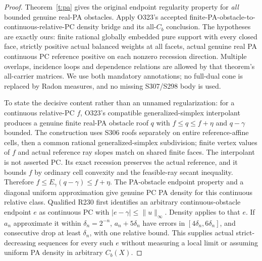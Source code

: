 \documentclass[11pt]{article}
\begin{document}
\begin{proof}
Theorem~\ref{t:pa} gives the original endpoint regularity property for \emph{all} bounded genuine real-PA obstacles. Apply O323's accepted finite-PA-obstacle-to-continuous-relative-PC density bridge and its all-$C_b$ conclusion. The hypotheses are exactly ours: finite rational globally embedded pure support with every closed face, strictly positive actual balanced weights at all facets, actual genuine real PA continuous PC reference positive on each nonzero recession direction. Multiple overlaps, incidence loops and dependence relations are allowed by that theorem's all-carrier matrices. We use both mandatory annotations; no full-dual cone is replaced by Radon measures, and no missing S307/S298 body is used.

To state the decisive content rather than an unnamed regularization: for a continuous relative-PC $f$, O323's compatible generalized-simplex interpolant produces a genuine finite real-PA obstacle roof $q$ with $f\leq q\leq f+\eta$ and $q-\gamma$ bounded. The construction uses S306 roofs separately on entire reference-affine cells, then a common rational generalized-simplex subdivision; finite vertex values of $f$ and actual reference ray slopes match on shared finite faces. The interpolant is not asserted PC. Its exact recession preserves the actual reference, and it bounds $f$ by ordinary cell convexity and the feasible-ray secant inequality. Therefore $f\leq E_\gamma(q-\gamma)\leq f+\eta$. The PA-obstacle endpoint property and a diagonal uniform approximation give genuine PC PA density for this continuous relative class. Qualified R230 first identifies an arbitrary continuous-obstacle endpoint $e$ as continuous PC with $|e-\gamma|\leq\|u\|_\infty$. Density applies to that $e$. If $a_n$ approximate it within $\delta_n=2^{-n}$, $a_n+5\delta_n$ have errors in $[4\delta_n,6\delta_n]$, and consecutive drop at least $\delta_n$, with one relative bound. This supplies actual strict-decreasing sequences for every such $e$ without measuring a local limit or assuming uniform PA density in arbitrary $C_b(X)$.
\end{proof}
\end{document}

